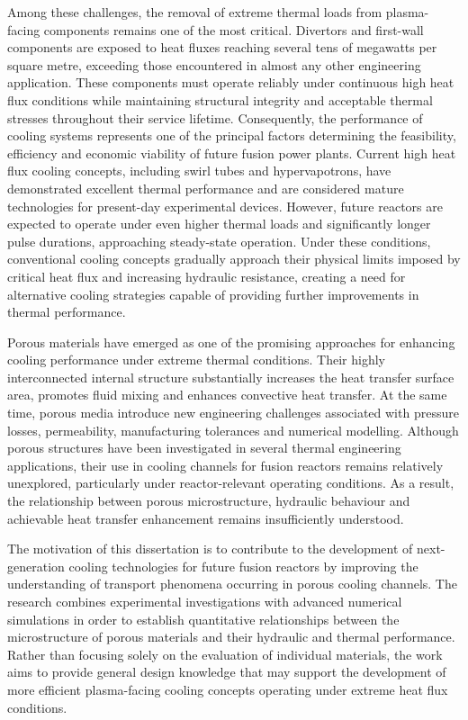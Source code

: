 \documentclass[a4paper]{article}
\begin{document}
Among these challenges, the removal of extreme thermal loads from plasma-facing components remains one of the most critical. Divertors and first-wall components are exposed to heat fluxes reaching several tens of megawatts per square metre, exceeding those encountered in almost any other engineering application. These components must operate reliably under continuous high heat flux conditions while maintaining structural integrity and acceptable thermal stresses throughout their service lifetime. Consequently, the performance of cooling systems represents one of the principal factors determining the feasibility, efficiency and economic viability of future fusion power plants. Current high heat flux cooling concepts, including swirl tubes and hypervapotrons, have demonstrated excellent thermal performance and are considered mature technologies for present-day experimental devices. However, future reactors are expected to operate under even higher thermal loads and significantly longer pulse durations, approaching steady-state operation. Under these conditions, conventional cooling concepts gradually approach their physical limits imposed by critical heat flux and increasing hydraulic resistance, creating a need for alternative cooling strategies capable of providing further improvements in thermal performance.

Porous materials have emerged as one of the promising approaches for enhancing cooling performance under extreme thermal conditions. Their highly interconnected internal structure substantially increases the heat transfer surface area, promotes fluid mixing and enhances convective heat transfer. At the same time, porous media introduce new engineering challenges associated with pressure losses, permeability, manufacturing tolerances and numerical modelling. Although porous structures have been investigated in several thermal engineering applications, their use in cooling channels for fusion reactors remains relatively unexplored, particularly under reactor-relevant operating conditions. As a result, the relationship between porous microstructure, hydraulic behaviour and achievable heat transfer enhancement remains insufficiently understood.

The motivation of this dissertation is to contribute to the development of next-generation cooling technologies for future fusion reactors by improving the understanding of transport phenomena occurring in porous cooling channels. The research combines experimental investigations with advanced numerical simulations in order to establish quantitative relationships between the microstructure of porous materials and their hydraulic and thermal performance. Rather than focusing solely on the evaluation of individual materials, the work aims to provide general design knowledge that may support the development of more efficient plasma-facing cooling concepts operating under extreme heat flux conditions.
\end{document}
